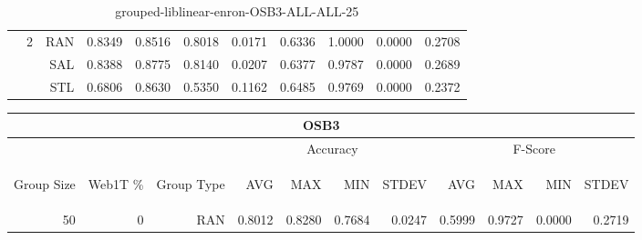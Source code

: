 \begin{center}
\begin{table}[htbp]
\begin{center}
\begin{tabular}{ | r | r | r | r | r | r | r | r | r | r | r |}
 & \multirow{3}{*}{2} & RAN & 0.8349 & 0.8516 & 0.8018 & 0.0171 & 0.6336 & 1.0000 & 0.0000 & 0.2708\\ \cline{3-11}
 &   & SAL & 0.8388 & 0.8775 & 0.8140 & 0.0207 & 0.6377 & 0.9787 & 0.0000 & 0.2689\\ \cline{3-11}
 &   & STL & 0.6806 & 0.8630 & 0.5350 & 0.1162 & 0.6485 & 0.9769 & 0.0000 & 0.2372\\ \cline{2-11}
\hline
\end{tabular}
\caption{grouped-liblinear-enron-OSB3-ALL-ALL-25}
\end{center}
 \end{table}
\end{center}

\begin{center}
\begin{table}[htbp] 
 \begin{center}
\begin{tabular}{ | r | r | r | r | r | r | r | r | r | r | r |}
\hline
\multicolumn{11}{|c|}{OSB3}\\
\hline
 & & & \multicolumn{4}{|c|}{Accuracy} & \multicolumn{4}{|c|}{F-Score}\\ \cline{4-11}
\begin{sideways}Group Size\end{sideways} & \begin{sideways}Web1T \%\end{sideways} & \begin{sideways}Group Type\end{sideways} & \begin{sideways}AVG\end{sideways} & \begin{sideways}MAX\end{sideways} & \begin{sideways}MIN\end{sideways} & \begin{sideways}STDEV\end{sideways} & \begin{sideways}AVG\end{sideways} & \begin{sideways}MAX\end{sideways} & \begin{sideways}MIN\end{sideways} & \begin{sideways}STDEV\end{sideways}\\
\hline
\multirow{6}{*}{50}
 & \multirow{3}{*}{0} & RAN & 0.8012 & 0.8280 & 0.7684 & 0.0247 & 0.5999 & 0.9727 & 0.0000 & 0.2719\\ \cline{3-11}

\end{tabular}
\end{center}
\end{table}
\end{center}
